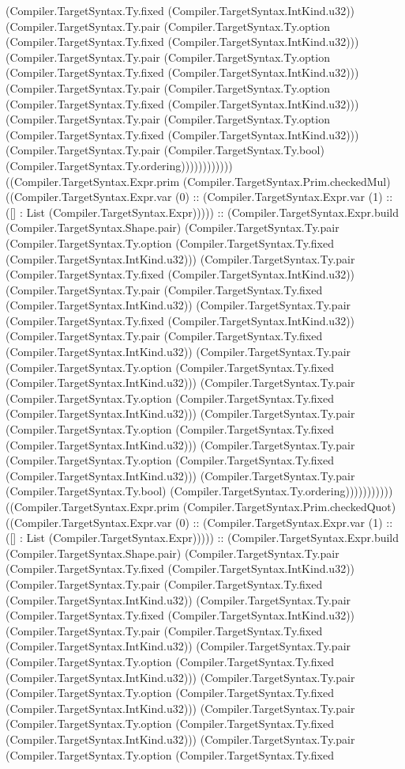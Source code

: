 \documentclass[11pt]{article}
\begin{document}
(Compiler.TargetSyntax.Ty.fixed (Compiler.TargetSyntax.IntKind.u32)) (Compiler.TargetSyntax.Ty.pair (Compiler.TargetSyntax.Ty.option (Compiler.TargetSyntax.Ty.fixed (Compiler.TargetSyntax.IntKind.u32))) (Compiler.TargetSyntax.Ty.pair (Compiler.TargetSyntax.Ty.option (Compiler.TargetSyntax.Ty.fixed (Compiler.TargetSyntax.IntKind.u32))) (Compiler.TargetSyntax.Ty.pair (Compiler.TargetSyntax.Ty.option (Compiler.TargetSyntax.Ty.fixed (Compiler.TargetSyntax.IntKind.u32))) (Compiler.TargetSyntax.Ty.pair (Compiler.TargetSyntax.Ty.option (Compiler.TargetSyntax.Ty.fixed (Compiler.TargetSyntax.IntKind.u32))) (Compiler.TargetSyntax.Ty.pair (Compiler.TargetSyntax.Ty.bool) (Compiler.TargetSyntax.Ty.ordering)))))))))))) ((Compiler.TargetSyntax.Expr.prim (Compiler.TargetSyntax.Prim.checkedMul) ((Compiler.TargetSyntax.Expr.var (0) :: (Compiler.TargetSyntax.Expr.var (1) :: ([] : List (Compiler.TargetSyntax.Expr))))) :: (Compiler.TargetSyntax.Expr.build (Compiler.TargetSyntax.Shape.pair) (Compiler.TargetSyntax.Ty.pair (Compiler.TargetSyntax.Ty.option (Compiler.TargetSyntax.Ty.fixed (Compiler.TargetSyntax.IntKind.u32))) (Compiler.TargetSyntax.Ty.pair (Compiler.TargetSyntax.Ty.fixed (Compiler.TargetSyntax.IntKind.u32)) (Compiler.TargetSyntax.Ty.pair (Compiler.TargetSyntax.Ty.fixed (Compiler.TargetSyntax.IntKind.u32)) (Compiler.TargetSyntax.Ty.pair (Compiler.TargetSyntax.Ty.fixed (Compiler.TargetSyntax.IntKind.u32)) (Compiler.TargetSyntax.Ty.pair (Compiler.TargetSyntax.Ty.fixed (Compiler.TargetSyntax.IntKind.u32)) (Compiler.TargetSyntax.Ty.pair (Compiler.TargetSyntax.Ty.option (Compiler.TargetSyntax.Ty.fixed (Compiler.TargetSyntax.IntKind.u32))) (Compiler.TargetSyntax.Ty.pair (Compiler.TargetSyntax.Ty.option (Compiler.TargetSyntax.Ty.fixed (Compiler.TargetSyntax.IntKind.u32))) (Compiler.TargetSyntax.Ty.pair (Compiler.TargetSyntax.Ty.option (Compiler.TargetSyntax.Ty.fixed (Compiler.TargetSyntax.IntKind.u32))) (Compiler.TargetSyntax.Ty.pair (Compiler.TargetSyntax.Ty.option (Compiler.TargetSyntax.Ty.fixed (Compiler.TargetSyntax.IntKind.u32))) (Compiler.TargetSyntax.Ty.pair (Compiler.TargetSyntax.Ty.bool) (Compiler.TargetSyntax.Ty.ordering))))))))))) ((Compiler.TargetSyntax.Expr.prim (Compiler.TargetSyntax.Prim.checkedQuot) ((Compiler.TargetSyntax.Expr.var (0) :: (Compiler.TargetSyntax.Expr.var (1) :: ([] : List (Compiler.TargetSyntax.Expr))))) :: (Compiler.TargetSyntax.Expr.build (Compiler.TargetSyntax.Shape.pair) (Compiler.TargetSyntax.Ty.pair (Compiler.TargetSyntax.Ty.fixed (Compiler.TargetSyntax.IntKind.u32)) (Compiler.TargetSyntax.Ty.pair (Compiler.TargetSyntax.Ty.fixed (Compiler.TargetSyntax.IntKind.u32)) (Compiler.TargetSyntax.Ty.pair (Compiler.TargetSyntax.Ty.fixed (Compiler.TargetSyntax.IntKind.u32)) (Compiler.TargetSyntax.Ty.pair (Compiler.TargetSyntax.Ty.fixed (Compiler.TargetSyntax.IntKind.u32)) (Compiler.TargetSyntax.Ty.pair (Compiler.TargetSyntax.Ty.option (Compiler.TargetSyntax.Ty.fixed (Compiler.TargetSyntax.IntKind.u32))) (Compiler.TargetSyntax.Ty.pair (Compiler.TargetSyntax.Ty.option (Compiler.TargetSyntax.Ty.fixed (Compiler.TargetSyntax.IntKind.u32))) (Compiler.TargetSyntax.Ty.pair (Compiler.TargetSyntax.Ty.option (Compiler.TargetSyntax.Ty.fixed (Compiler.TargetSyntax.IntKind.u32))) (Compiler.TargetSyntax.Ty.pair (Compiler.TargetSyntax.Ty.option (Compiler.TargetSyntax.Ty.fixed 
\end{document}
